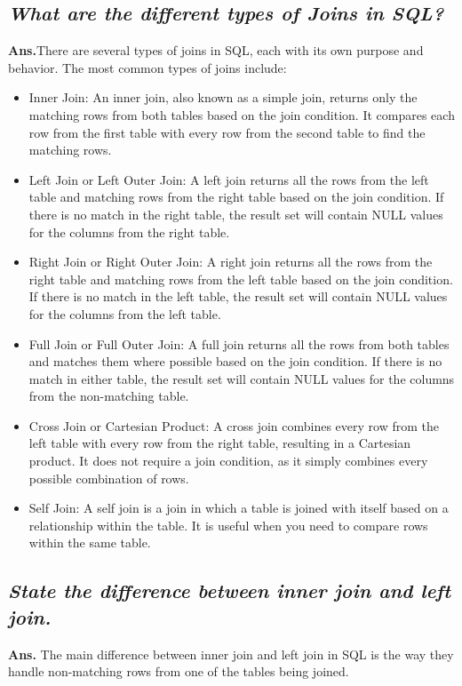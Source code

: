 \documentclass{article}
\begin{document}
\subsection{\textit{What are the different types of Joins in SQL?}}
\textbf{Ans.}There are several types of joins in SQL, each with its own purpose and behavior. The most common types of joins include:
\begin{itemize}
    \item Inner Join: An inner join, also known as a simple join, returns only the matching rows from both tables based on the join condition. It compares each row from the first table with every row from the second table to find the matching rows.
    \item Left Join or Left Outer Join: A left join returns all the rows from the left table and matching rows from the right table based on the join condition. If there is no match in the right table, the result set will contain NULL values for the columns from the right table.
    \item Right Join or Right Outer Join: A right join returns all the rows from the right table and matching rows from the left table based on the join condition. If there is no match in the left table, the result set will contain NULL values for the columns from the left table.
    \item Full Join or Full Outer Join: A full join returns all the rows from both tables and matches them where possible based on the join condition. If there is no match in either table, the result set will contain NULL values for the columns from the non-matching table.
    \item Cross Join or Cartesian Product: A cross join combines every row from the left table with every row from the right table, resulting in a Cartesian product. It does not require a join condition, as it simply combines every possible combination of rows.
    \item Self Join: A self join is a join in which a table is joined with itself based on a relationship within the table. It is useful when you need to compare rows within the same table.
\end{itemize}
\subsection{\textit{State the difference between inner join and left join.}}
\textbf{Ans.} The main difference between inner join and left join in SQL is the way they handle non-matching rows from one of the tables being joined.\\
\end{document}
